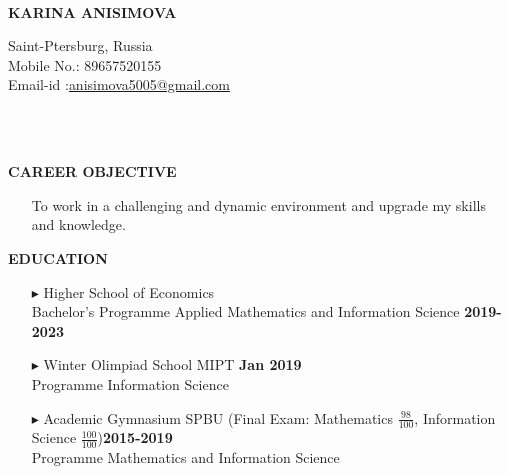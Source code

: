 \documentclass[a4paper,10pt]{article}
\begin{document}
	\hspace{0.5cm}\\[-0.2cm]
	\begin{minipage}{0.5\textwidth}
		\begin{flushleft}
			\huge \textbf{\* \* KARINA ANISIMOVA} 
			\normalsize
		\end{flushleft}
	\end{minipage}
	\begin{minipage}{0.51\textwidth}
		\begin{flushright}
			\textcolor[gray]{0.3}{
				\indent Saint-Ptersburg, Russia\\
				\indent Mobile No.: 89657520155  \\
				\indent Email-id :\href{mailto:anisimova5005@gmail.com} {anisimova5005@gmail.com}\\  	
			}
		\end{flushright}
	\end{minipage}
    \\ \\
    
    
    \colorbox{magicmint}{
		\begin{minipage}{0.96\textwidth}
			\textbf{CAREER OBJECTIVE}
		\end{minipage}
	}
	\begin{itemize}
		\item[]To work in a challenging and dynamic environment and upgrade my skills and knowledge.
	\end{itemize}

	 \colorbox{magicmint}{
		\begin{minipage}{0.96\textwidth}
			\textbf{EDUCATION}
		\end{minipage}
	}

	\begin{itemize}
		\item [$\blacktriangleright$]  Higher School of Economics\\ Bachelor’s Programme Applied Mathematics and Information Science \hspace{3.9cm} \textbf{2019-2023}
		\item[$\blacktriangleright$]  Winter Olimpiad School MIPT \hspace{10.4cm}\textbf{Jan 2019} \\ Programme Information Science 
		\item[$\blacktriangleright$]  Academic Gymnasium SPBU (Final Exam: Mathematics $\frac{98}{100}$, Information Science $\frac{100}{100}$)\hspace{1.7cm}\textbf{2015-2019} \\ Programme Mathematics and Information Science 
	\end{itemize}
	
\end{document}
